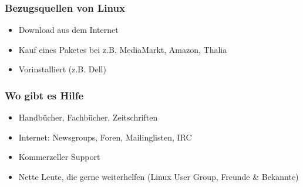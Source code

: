 \documentclass[compress]{beamer}
\begin{document}
\begin{frame}
	\frametitle{Bezugsquellen von Linux}
	\begin{itemize}
		\item Download aus dem Internet
		\item Kauf eines Paketes bei z.B. MediaMarkt, Amazon, Thalia
		\item Vorinstalliert (z.B. Dell)
	\end{itemize}
\end{frame}

\begin{frame}
	\frametitle{Wo gibt es Hilfe}
	\begin{itemize}
		\item Handbücher, Fachbücher, Zeitschriften
		\item Internet: Newsgroups, Foren, Mailinglisten, IRC
		\item Kommerzeller Support
		\item Nette Leute, die gerne weiterhelfen (Linux User Group, Freunde \& Bekannte)
	\end{itemize}
\end{frame}
\end{document}
